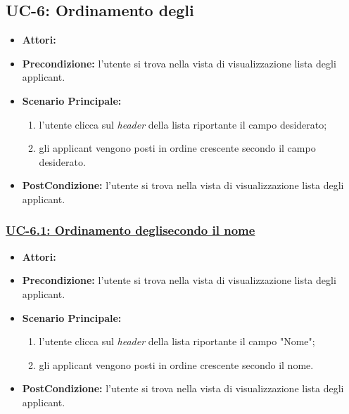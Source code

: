 \subsection{UC-6: Ordinamento degli\applicant}
\begin{itemize}
	\item \textbf{Attori:}\loggedusr
	\item \textbf{Precondizione:} l'utente si trova nella vista di visualizzazione lista degli applicant.
	\item \textbf{Scenario Principale:}
	\begin{enumerate}
		\item l'utente clicca sul \textit{header} della lista riportante il campo desiderato;
		\item gli applicant vengono posti in ordine crescente secondo il campo desiderato.
	\end{enumerate}
	\item \textbf{PostCondizione:}  l'utente si trova nella vista di visualizzazione lista degli applicant.
\end{itemize}


\subsubsection{\underline{UC-6.1: Ordinamento degli\applicant secondo il nome}}
\begin{itemize}
	\item \textbf{Attori:}\loggedusr
	\item \textbf{Precondizione:} l'utente si trova nella vista di visualizzazione lista degli applicant.
	\item \textbf{Scenario Principale:}
	\begin{enumerate}
		\item l'utente clicca sul \textit{header} della lista riportante il campo "Nome";
		\item gli applicant vengono posti in ordine crescente secondo il nome.
	\end{enumerate}
	\item \textbf{PostCondizione:}  l'utente si trova nella vista di visualizzazione lista degli applicant.
\end{itemize}

